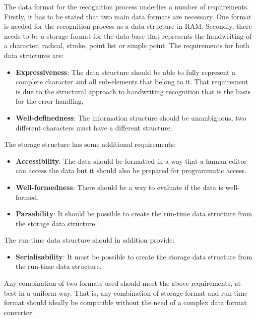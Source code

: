 The data format for the recognition process underlies a number of requirements.
Firstly, it has to be stated that two main data formats are necessary. 
One format is needed for the recognition process as a data structure in RAM.
Secondly, there needs to be a storage format for the data base that represents
the handwriting of a character, radical, stroke, point list or simple point.
The requirements for both data structures are:
\begin{itemize}
  \item \textbf{Expressiveness}: The data structure should be able to 
        fully represent a complete character and all sub-elements that belong 
        to it. That requirement is due to the structural approach to handwriting
        recognition that is the basis for the error handling.

  \item \textbf{Well-definedness}: The information structure should be 
        unambiguous, two different characters must have a different structure.
\end{itemize}
The storage structure has some additional requirements:
\begin{itemize}
  \item \textbf{Accessibility}: The data should be formatted in a way that a 
        human editor can access the data but it should also be prepared for 
        programmatic access.
  \item \textbf{Well-formedness}: There should be a way to evaluate if the data 
        is well-formed.
  \item \textbf{Parsability}: It should be possible to create the run-time data 
        structure from the storage data structure.
\end{itemize}
The run-time data structure should in addition provide:
\begin{itemize}
  \item \textbf{Serialisability}: It must be possible to create the storage 
        data structure from the run-time data structure.
\end{itemize}
Any combination of two formats used should meet the above requirements, 
at best in a uniform way. That is, any combination of storage format and 
run-time format should ideally be compatible without the need of a complex
data format converter.



